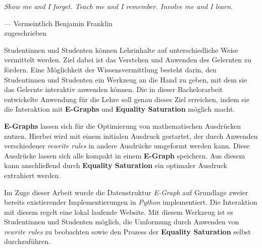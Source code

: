 \vspace{10mm}
\begin{center}
    {\itshape
    \rmfamily
    \glqq Show me and I forget.
    Teach me and I remember. 
    Involve me and I learn.\grqq}
    \vspace{-3mm}
    \begin{flushright}
        \footnotesize
        --- Vermeintlich 
        Benjamin Franklin \\
        zugeschrieben
    \end{flushright}
\end{center}\vspace{5mm}

Studentinnen und Studenten können Lehrinhalte auf unterschiedliche Weise vermittelt werden.
Ziel dabei ist das Verstehen und Anwenden des Gelernten zu fördern.
Eine Möglichkeit der Wissensvermittlung besteht darin, den Studentinnen und Studenten ein
Werkzeug an die Hand zu geben, mit dem sie das Gelernte interaktiv anwenden können.
Die in dieser Bachelorarbeit entwickelte Anwendung für die Lehre soll genau dieses Ziel erreichen, 
indem sie die Interaktion mit \textbf{E-Graphs} und \textbf{Equality Saturation} möglich macht.

\textbf{E-Graphs} lassen sich für die Optimierung von mathematischen Ausdrücken nutzen.
Hierbei wird mit einem initialen Ausdruck gestartet, der durch Anwenden verschiedener 
\textit{rewrite rules} in andere Ausdrücke umgeformt werden kann.
Diese Ausdrücke lassen sich alle kompakt in einem \textbf{E-Graph} speichern. Aus diesem
kann anschließend durch \textbf{Equality Saturation} ein optimaler Ausdruck extrahiert werden.

Im Zuge dieser Arbeit wurde die Datenstruktur \textit{E-Graph} auf Grundlage zweier bereits existierender Implementierungen
in \textit{Python} implementiert. Die Interaktion mit diesem regelt eine lokal laufende Website.
Mit diesem Werkzeug ist es Studentinnen und Studenten möglich, die Umformung durch Anwenden von \textit{rewrite rules}
zu beobachten sowie den Prozess der \textbf{Equality Saturation} selbst durchzuführen.

